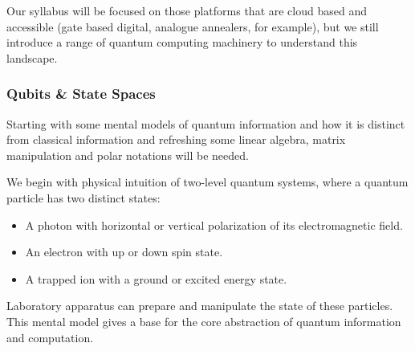 


Our syllabus will be focused on those platforms that are cloud based and accessible (gate based digital, analogue annealers, for example), 
but we still introduce a range of quantum computing machinery to understand this landscape.

\subsubsection{Qubits \& State Spaces}

Starting with some mental models of quantum information and how it is distinct from classical information
and refreshing some linear algebra, matrix manipulation and polar notations will be needed.  

We begin with physical intuition of two-level quantum systems, where a quantum particle has two distinct states:
\begin{itemize}
	\item A photon with horizontal or vertical polarization of its electromagnetic field.
	\item An electron with up or down spin state.
	\item A trapped ion with a ground or excited energy state.
\end{itemize}

Laboratory apparatus can prepare and manipulate  the state of these particles.
This mental model gives a base for the core abstraction of quantum information and computation.

